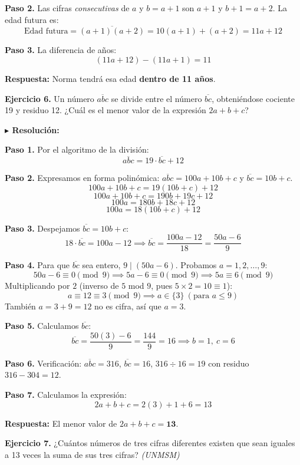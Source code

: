 \documentclass[10pt]{article}
\newcommand{\ejercicio}[2]{%
  \begin{enuncbox}
    \textbf{\textcolor{enunciado}{Ejercicio #1.}} #2
  \end{enuncbox}
}
\newcommand{\resolucion}{\vspace{2pt}\textbf{\textcolor{resolucion}{$\blacktriangleright$ Resolución:}}\vspace{4pt}}
\newcommand{\respuesta}[1]{%
  \begin{respbox}
    \textbf{\textcolor{respuesta}{Respuesta:}} #1
  \end{respbox}
}
\begin{document}
\textbf{Paso 2.} Las cifras \emph{consecutivas} de $a$ y $b = a+1$ son $a+1$ y $b+1 = a+2$. La edad futura es:
\[
    \text{Edad futura} = \overline{(a+1)(a+2)} = 10(a+1) + (a+2) = 11a + 12
\]

\textbf{Paso 3.} La diferencia de años:
\[
    (11a + 12) - (11a + 1) = 11
\]

\respuesta{Norma tendrá esa edad \textbf{dentro de 11 años}.}

\ejercicio{6}{Un número $\overline{abc}$ se divide entre el número $\overline{bc}$, obteniéndose cociente 19 y residuo 12. ¿Cuál es el menor valor de la expresión $2a + b + c$?}

\resolucion

\textbf{Paso 1.} Por el algoritmo de la división:
\[
    \overline{abc} = 19 \cdot \overline{bc} + 12
\]

\textbf{Paso 2.} Expresamos en forma polinómica: $\overline{abc} = 100a + 10b + c$ y $\overline{bc} = 10b + c$.
\[
    100a + 10b + c = 19(10b + c) + 12
\]
\[
    100a + 10b + c = 190b + 19c + 12
\]
\[
    100a = 180b + 18c + 12
\]
\[
    100a = 18(10b + c) + 12
\]

\textbf{Paso 3.} Despejamos $\overline{bc} = 10b + c$:
\[
    18 \cdot \overline{bc} = 100a - 12 \implies \overline{bc} = \frac{100a - 12}{18} = \frac{50a - 6}{9}
\]

\textbf{Paso 4.} Para que $\overline{bc}$ sea entero, $9 \mid (50a - 6)$. Probamos $a = 1, 2, \ldots, 9$:
\[
    50a - 6 \equiv 0 \pmod{9} \implies 5a - 6 \equiv 0 \pmod 9 \implies 5a \equiv 6 \pmod 9
\]
Multiplicando por $2$ (inverso de $5$ mod $9$, pues $5 \times 2 = 10 \equiv 1$):
\[
    a \equiv 12 \equiv 3 \pmod{9} \implies a \in \{3\}\ (\text{para } a \leq 9)
\]
También $a = 3 + 9 = 12$ no es cifra, así que $a = 3$.

\textbf{Paso 5.} Calculamos $\overline{bc}$:
\[
    \overline{bc} = \frac{50(3)-6}{9} = \frac{144}{9} = 16 \implies b=1,\ c=6
\]

\textbf{Paso 6.} Verificación: $\overline{abc} = 316$, $\overline{bc} = 16$, $316 \div 16 = 19$ con residuo $316 - 304 = 12$. \checkmark

\textbf{Paso 7.} Calculamos la expresión:
\[
    2a + b + c = 2(3) + 1 + 6 = 13
\]

\respuesta{El menor valor de $2a + b + c = \mathbf{13}$.}

\ejercicio{7}{¿Cuántos números de tres cifras diferentes existen que sean iguales a 13 veces la suma de sus tres cifras? \hfill \textit{(UNMSM)}}
\end{document}
